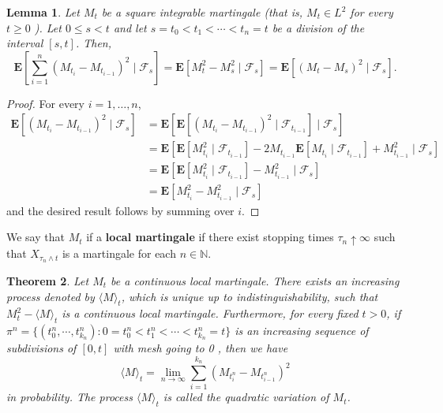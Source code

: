 \documentclass[twoside, 12pt]{book}
\numberwithin{equation}{chapter}
\newtheorem{theorem}{Theorem}[section]
\newtheorem{lemma}[theorem]{Lemma}
\def\mN{{\mathbb N}}
\def\bE{{\mathbf E}}
\def\geq{\geqslant}
\def\leq{\leqslant}
\begin{document}
	\begin{lemma}
		Let $M_t$ be a square integrable martingale (that is, $M_t \in L^2$ for every $t \geq 0$ ). Let $0 \leq s<t$ and let $s=t_0<t_1<\cdots<t_n=t$ be a division of the interval $[s, t]$. Then,
		$$
		\bE\left[\sum_{i=1}^n\left(M_{t_i}-M_{t_{i-1}}\right)^2 \mid \mathcal{F}_s\right]=\bE\left[M_t^2-M_s^2 \mid \mathcal{F}_s\right]=\bE\left[\left(M_t-M_s\right)^2 \mid \mathcal{F}_s\right] .
		$$
	\end{lemma}
	\begin{proof}
		For every $i=1, \ldots, n$,
		$$
		\begin{aligned}
			\bE \left[ \left(M_{t_i}-M_{t_{i-1}}\right)^2 \mid \mathcal{F}_s\right] & =\bE\left[\bE \left[\left(M_{t_i}-M_{t_{i-1}}\right)^2 \mid \mathcal{F}_{t_{i-1}}\right] \mid \mathcal{F}_s\right] \\
			& =\bE\left[\bE\left[M_{t_i}^2 \mid \mathcal{F}_{t_{i-1}}\right]-2 M_{t_{i-1}} \bE\left[M_{t_i} \mid \mathcal{F}_{t_{i-1}}\right]+M_{t_{i-1}}^2 \mid \mathcal{F}_s\right] \\
			& =\bE\left[\bE\left[M_{t_i}^2 \mid \mathcal{F}_{t_{i-1}}\right]-M_{t_{i-1}}^2 \mid \mathcal{F}_s\right] \\
			& =\bE\left[M_{t_i}^2-M_{t_{i-1}}^2 \mid \mathcal{F}_s\right]
		\end{aligned}
		$$
		and the desired result follows by summing over $i$. 
	\end{proof}
	
	We say that $M_t$ if a {\bf local martingale} if there exist stopping times $\tau_n\uparrow \infty$ such that $X_{\tau_n\wedge t}$ is a martingale for each $n\in \mN$.
	\begin{theorem}\label{Thm:quadratic}
		Let $M_t$ be a continuous local martingale. There exists an increasing process denoted by $\langle M \rangle_t$, which is unique up to indistinguishability, such that $M_t^2-\langle M\rangle_t$ is a continuous local martingale. Furthermore, for every fixed $t>0$, if $\pi^n=\{(t_0^n,\cdots, t_{k_n}^n): 0=t_0^n<t_1^n<\cdots<t_{k_n}^n=t\}$ is an increasing sequence of subdivisions of $[0, t]$ with mesh going to 0 , then we have
		$$
		\langle  M\rangle_t=\lim _{n \rightarrow \infty} \sum_{i=1}^{k_n}\left(M_{t_i^n}-M_{t_{i-1}^n}\right)^2
		$$
		in probability. The process $\langle M\rangle_t$ is called the quadratic variation of $M_t $. 
	\end{theorem}
	
\end{document}
